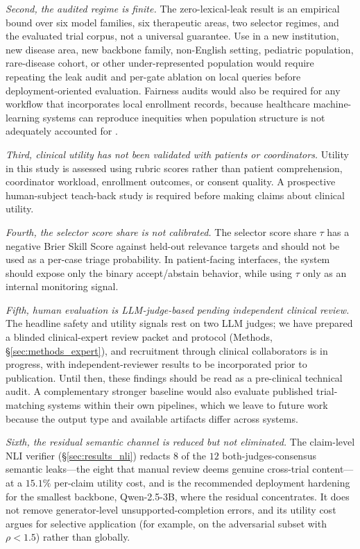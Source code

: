 \documentclass[pdflatex,Numbered]{sn-jnl}
\theoremstyle{plain}
\begin{document}
\emph{Second, the audited regime is finite.} The zero-lexical-leak result is an empirical bound over six model families, six therapeutic areas, two selector regimes, and the evaluated trial corpus, not a universal guarantee. Use in a new institution, new disease area, new backbone family, non-English setting, pediatric population, rare-disease cohort, or other under-represented population \citep{unger2019recruitment,clark2019barriers,fda2022diversity,chang2024fair} would require repeating the leak audit and per-gate ablation on local queries before deployment-oriented evaluation. Fairness audits would also be required for any workflow that incorporates local enrollment records, because healthcare machine-learning systems can reproduce inequities when population structure is not adequately accounted for \citep{obermeyer2019dissecting}.

\emph{Third, clinical utility has not been validated with patients or coordinators.} Utility in this study is assessed using rubric scores rather than patient comprehension, coordinator workload, enrollment outcomes, or consent quality. A prospective human-subject teach-back study is required before making claims about clinical utility.

\emph{Fourth, the selector score share is not calibrated.} The selector score share $\tau$ has a negative Brier Skill Score against held-out relevance targets and should not be used as a per-case triage probability. In patient-facing interfaces, the system should expose only the binary accept/abstain behavior, while using $\tau$ only as an internal monitoring signal.

\emph{Fifth, human evaluation is LLM-judge-based pending independent clinical review.} The headline safety and utility signals rest on two LLM judges; we have prepared a blinded clinical-expert review packet and protocol (Methods, \S\ref{sec:methods_expert}), and recruitment through clinical collaborators is in progress, with independent-reviewer results to be incorporated prior to publication. Until then, these findings should be read as a pre-clinical technical audit. A complementary stronger baseline would also evaluate published trial-matching systems within their own pipelines, which we leave to future work because the output type and available artifacts differ across systems.

\emph{Sixth, the residual semantic channel is reduced but not eliminated.} The claim-level NLI verifier (\S\ref{sec:results_nli}) redacts $8$ of the $12$ both-judges-consensus semantic leaks---the eight that manual review deems genuine cross-trial content---at a $15.1\%$ per-claim utility cost, and is the recommended deployment hardening for the smallest backbone, Qwen-2.5-3B, where the residual concentrates. It does not remove generator-level unsupported-completion errors, and its utility cost argues for selective application (for example, on the adversarial subset with $\rho < 1.5$) rather than globally.
\end{document}
